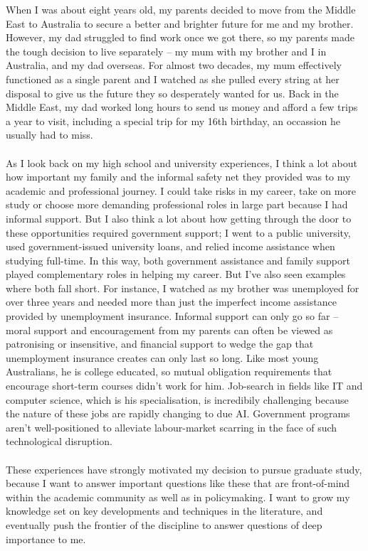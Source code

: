 \documentclass[11pt]{article}
\begin{document}
When I was about eight years old, my parents decided to move from the Middle East to Australia to secure a better and brighter future for me and my brother. However, my dad struggled to find work once we got there, so my parents made the tough decision to live separately -- my mum with my brother and I in Australia, and my dad overseas. For almost two decades, my mum effectively functioned as a single parent and I watched as she pulled every string at her disposal to give us the future they so desperately wanted for us. Back in the Middle East, my dad worked long hours to send us money and afford a few trips a year to visit, including a special trip for my 16th birthday, an occassion he usually had to miss.
\\~\\
As I look back on my high school and university experiences, I think a lot about how important my family and the informal safety net they provided was to my academic and professional journey. I could take risks in my career, take on more study or choose more demanding professional roles in large part because I had informal support. But I also think a lot about how getting through the door to these opportunities required government support; I went to a public university, used government-issued university loans, and relied income assistance when studying full-time. In this way, both government assistance and family support played complementary roles in helping my career. But I've also seen examples where both fall short. For instance, I watched as my brother was unemployed for over three years and needed more than just the imperfect income assistance provided by unemployment insurance. Informal support can only go so far -- moral support and encouragement from my parents can often be viewed as patronising or insensitive, and financial support to wedge the gap that unemployment insurance creates can only last so long. Like most young Australians, he is college educated, so mutual obligation requirements that encourage short-term courses didn't work for him. Job-search in fields like IT and computer science, which is his specialisation, is incredibily challenging because the nature of these jobs are rapidly changing to due AI. Government programs aren't well-positioned to alleviate labour-market scarring in the face of such technological disruption. 
\\~\\
These experiences have strongly motivated my decision to pursue graduate study, because I want to answer important questions like these that are front-of-mind within the academic community as well as in policymaking. I want to grow my knowledge set on key developments and techniques in the literature, and eventually push the frontier of the discipline to answer questions of deep importance to me.  
\end{document}
